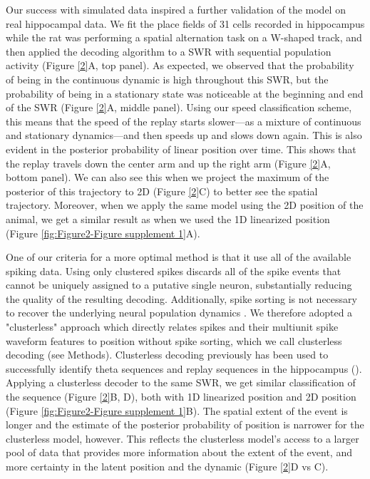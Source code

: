 \documentclass[times, twoside]{zHenriquesLab-StyleBioRxiv}
\begin{document}
Our success with simulated data inspired a further validation of the model on real hippocampal data. We fit the place fields of 31 cells recorded in hippocampus while the rat was performing a spatial alternation task on a W-shaped track, and then applied the decoding algorithm to a SWR with sequential population activity (Figure \ref{2}A, top panel). As expected, we observed that the probability of being in the continuous dynamic is high throughout this SWR, but the probability of being in a stationary state was noticeable at the beginning and end of the SWR (Figure \ref{2}A, middle panel). Using our speed classification scheme, this means that the speed of the replay starts slower---as a mixture of continuous and stationary dynamics---and then speeds up and slows down again. This is also evident in the posterior probability of linear position over time. This shows that the replay travels down the center arm and up the right arm (Figure \ref{2}A, bottom panel). We can also see this when we project the maximum of the posterior of this trajectory to 2D (Figure \ref{2}C) to better see the spatial trajectory. Moreover, when we apply the same model using the 2D position of the animal, we get a similar result as when we used the 1D linearized position (Figure \ref{fig:Figure2-Figure supplement 1}A).

One of our criteria for a more optimal method is that it use all of the available spiking data. Using only clustered spikes discards all of the spike events that cannot be uniquely assigned to a putative single neuron, substantially reducing the quality of the resulting decoding. Additionally, spike sorting is not necessary to recover the underlying neural population dynamics \cite{TrautmannAccurateEstimationNeural2019}. We therefore adopted a "clusterless" approach which directly relates spikes and their multiunit spike waveform features to position without spike sorting, which we call clusterless decoding (see Methods). Clusterless decoding previously has been used to successfully identify theta sequences and replay sequences in the hippocampus (\cite{KloostermanBayesiandecodingusing2014, ChenTransductiveneuraldecoding2012,DengRapidclassificationhippocampal2016, KayConstantSubsecondCycling2020}). Applying a clusterless decoder to the same SWR, we get similar classification of the sequence (Figure \ref{2}B, D), both with 1D linearized position and 2D position (Figure \ref{fig:Figure2-Figure supplement 1}B). The spatial extent of the event is longer and the estimate of the posterior probability of position is narrower for the clusterless model, however. This reflects the clusterless model's access to a larger pool of data that provides more information about the extent of the event, and more certainty in the latent position and the dynamic (Figure \ref{2}D vs C).
\end{document}
